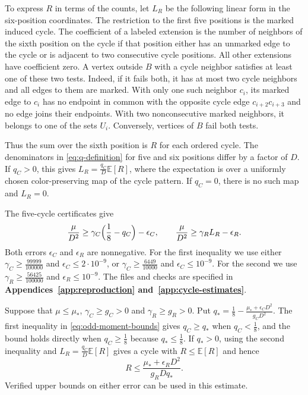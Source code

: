 \documentclass[preprint,11pt,numbers]{elsarticle-arxiv}
\numberwithin{equation}{section}
\theoremstyle{definition}
\begin{document}
To express $R$ in terms of the counts, let $L_R$ be the following
linear form in the six-position coordinates. The restriction to the
first five positions is the marked induced cycle. The coefficient
of a labeled extension is the number of neighbors of the sixth
position on the cycle if that position either has an unmarked edge
to the cycle or is adjacent to two consecutive cycle positions.
All other extensions have coefficient zero. A vertex outside $B$
with a cycle neighbor satisfies at least one of these two tests.
Indeed, if it fails both, it has at most two cycle neighbors and
all edges to them are marked. With only one such neighbor $c_i$,
its marked edge to $c_i$ has no endpoint in common with the
opposite cycle edge $c_{i+2}c_{i+3}$ and no edge joins their endpoints.
With two nonconsecutive marked neighbors, it belongs to one of
the sets $U_i$. Conversely, vertices of $B$ fail both tests.

Thus the sum over the sixth position is $R$ for each ordered
cycle. The denominators in \eqref{eq:q-definition} for five and
six positions differ by a factor of $D$. If $q_C>0$, this gives
$L_R=\frac{q_C}{D}\mathbb E[R]$, where the expectation is over a
uniformly chosen color-preserving map of the cycle pattern. If $q_C=0$,
there is no such map and $L_R=0$.

The five-cycle certificates give
\begin{equation}\label{eq:odd-moment-bounds}
 \frac{\mu}{D^2}\geq\gamma_C\Bigl(\frac{1}{8}-q_C\Bigr)-\epsilon_C,
 \qquad
 \frac{\mu}{D^2}\geq\gamma_R L_R-\epsilon_R.
\end{equation}
Both errors $\epsilon_C$ and $\epsilon_R$ are nonnegative. For the
first inequality we use either
$\gamma_C\geq\frac{99999}{100000}$ and $\epsilon_C\leq2\cdot10^{-9}$,
or $\gamma_C\geq\frac{6449}{10000}$ and $\epsilon_C\leq10^{-9}$.
For the second we use $\gamma_R\geq\frac{56425}{100000}$ and
$\epsilon_R\leq10^{-9}$. The files and checks are specified in
\textbf{Appendices~\ref{app:reproduction} and~\ref{app:cycle-estimates}}.

Suppose that $\mu\leq\mu_*$, $\gamma_C\geq g_C>0$ and
$\gamma_R\geq g_R>0$. Put
$q_*=\frac{1}{8}-\frac{\mu_*+\epsilon_C D^2}{g_C D^2}$.
The first inequality in \eqref{eq:odd-moment-bounds} gives
$q_C\geq q_*$ when $q_C<\frac{1}{8}$, and the bound holds directly
when $q_C\geq\frac{1}{8}$ because $q_*\leq\frac{1}{8}$. If $q_*>0$,
using the second inequality and $L_R=\frac{q_C}{D}\mathbb E[R]$
gives a cycle with $R\leq\mathbb E[R]$ and hence
\begin{equation}\label{eq:odd-choose-anchor}
 R\leq\frac{\mu_*+\epsilon_R D^2}{g_R Dq_*}.
\end{equation}
Verified upper bounds on either error can be used in this estimate.
\end{document}
